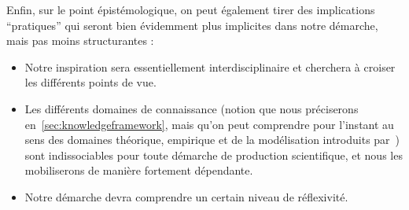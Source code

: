 Enfin, sur le point épistémologique, on peut également tirer des implications ``pratiques'' qui seront bien évidemment plus implicites dans notre démarche, mais pas moins structurantes :

\begin{itemize}
	\item Notre inspiration sera essentiellement interdisciplinaire et cherchera à croiser les différents points de vue.
	\item Les différents domaines de connaissance (notion que nous préciserons en~\ref{sec:knowledgeframework}, mais qu'on peut comprendre pour l'instant au sens des domaines théorique, empirique et de la modélisation introduits par~\cite{livet2010}) sont indissociables pour toute démarche de production scientifique, et nous les mobiliserons de manière fortement dépendante.
	\item Notre démarche devra comprendre un certain niveau de réflexivité.
\end{itemize}






\stars












